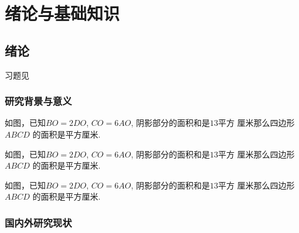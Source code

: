 \documentclass{USTBBook}
\begin{document}
\makeCover

\frontmatter
\pagestyle{fancy}

\setcounter{page}{0}
\cleardoublepage
{}

\tableofcontents

\mainmatter

\part{绪论与基础知识}

\chapter{绪论}

\begin{flushright}
   习题见 
\end{flushright}

\zhlipsum[1]

\section*{研究背景与意义}

\ToggleIndentFirst

\zhlipsum[2]

\begin{question*}
  \taskGrade
  如图，已知$BO=2DO$, $CO=6AO$, 阴影部分的面积和是$13$平方
  厘米那么四边形 $ABCD$ 的面积是\fillin[]平方厘米.
\end{question*}

\begin{question}
  \taskGrade[2]
  如图，已知$BO=2DO$, $CO=6AO$, 阴影部分的面积和是$13$平方
  厘米那么四边形 $ABCD$ 的面积是\fillin[]平方厘米.
\end{question}

\begin{question}
  \taskGrade[5]
  如图，已知$BO=2DO$, $CO=6AO$, 阴影部分的面积和是$13$平方
  厘米那么四边形 $ABCD$ 的面积是\fillin[]平方厘米.
\end{question}

\ToggleIndentFirst

\zhlipsum[6-7]

\newpage
\section{国内外研究现状}
\end{document}
